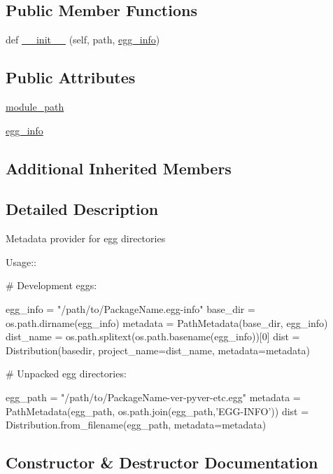 \subsection*{Public Member Functions}
\begin{DoxyCompactItemize}
\item 
def \hyperlink{classpkg__resources_1_1PathMetadata_a42afa04f667e8f792f431ec4eba76a5b}{\+\_\+\+\_\+init\+\_\+\+\_\+} (self, path, \hyperlink{classpkg__resources_1_1PathMetadata_a61a445362a417dfb470ebee020a73762}{egg\+\_\+info})
\end{DoxyCompactItemize}
\subsection*{Public Attributes}
\begin{DoxyCompactItemize}
\item 
\hyperlink{classpkg__resources_1_1PathMetadata_a32d4f91934149b639e6b3e88e802bd9f}{module\+\_\+path}
\item 
\hyperlink{classpkg__resources_1_1PathMetadata_a61a445362a417dfb470ebee020a73762}{egg\+\_\+info}
\end{DoxyCompactItemize}
\subsection*{Additional Inherited Members}


\subsection{Detailed Description}
\begin{DoxyVerb}Metadata provider for egg directories

Usage::

    # Development eggs:

    egg_info = "/path/to/PackageName.egg-info"
    base_dir = os.path.dirname(egg_info)
    metadata = PathMetadata(base_dir, egg_info)
    dist_name = os.path.splitext(os.path.basename(egg_info))[0]
    dist = Distribution(basedir, project_name=dist_name, metadata=metadata)

    # Unpacked egg directories:

    egg_path = "/path/to/PackageName-ver-pyver-etc.egg"
    metadata = PathMetadata(egg_path, os.path.join(egg_path,'EGG-INFO'))
    dist = Distribution.from_filename(egg_path, metadata=metadata)
\end{DoxyVerb}
 

\subsection{Constructor \& Destructor Documentation}
\mbox{\label{classpkg__resources_1_1PathMetadata_a42afa04f667e8f792f431ec4eba76a5b}} 
